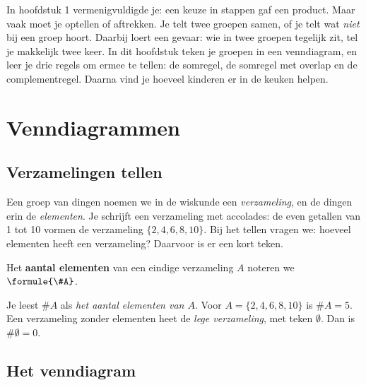 In hoofdstuk 1 vermenigvuldigde je: een keuze in stappen gaf een product. Maar vaak moet je optellen of aftrekken. Je telt twee groepen samen, of je telt wat \textit{niet} bij een groep hoort. Daarbij loert een gevaar: wie in twee groepen tegelijk zit, tel je makkelijk twee keer. In dit hoofdstuk teken je groepen in een venndiagram, en leer je drie regels om ermee te tellen: de somregel, de somregel met overlap en de complementregel. Daarna vind je hoeveel kinderen er in de keuken helpen.

\begin{oefeningen}[Start]

\end{oefeningen}


\section{Venndiagrammen}

\subsection{Verzamelingen tellen}

Een groep van dingen noemen we in de wiskunde een \textit{verzameling}, en de dingen erin de \textit{elementen}. Je schrijft een verzameling met accolades: de even getallen van 1 tot 10 vormen de verzameling $\{2, 4, 6, 8, 10\}$. Bij het tellen vragen we: hoeveel elementen heeft een verzameling? Daarvoor is er een kort teken.

\begin{theorie}
Het \textbf{\textcolor{accent}{aantal elementen}} van een eindige verzameling $A$ noteren we $\formule{\#A}$.
\end{theorie}

Je leest $\#A$ als \textit{het aantal elementen van $A$}. Voor $A = \{2, 4, 6, 8, 10\}$ is $\#A = 5$. Een verzameling zonder elementen heet de \textit{lege verzameling}, met teken $\emptyset$. Dan is $\#\emptyset = 0$.

\subsection{Het venndiagram}

